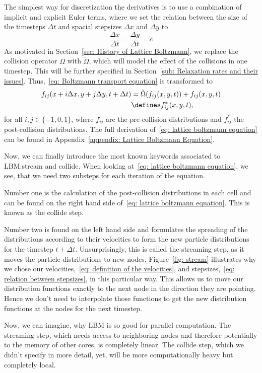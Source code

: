 The simplest way for discretization the derivatives is to use a combination of implicit and explicit Euler terms, where we set the relation between the size of the timesteps $\Delta t$ and spacial stepsizes $\Delta x$ and $\Delta y$ to
\begin{equation}
  \label{eq: relation between stepsizes}
  \frac{\Delta x} {\Delta{t}} = \frac{\Delta y} {\Delta{t}} = c
\end{equation}
As motivated in Section~\ref{sec: History of Lattice Boltzmann}, we replace the collision operator $\Omega$ with $\tilde{\Omega}$, which will model the effect of the collisions in one timestep. This will be further specified in Section~\ref{sub: Relaxation rates and their issues}.
Thus,~\eqref{eq: Boltzmann transport equation} is transformed to
\begin{equation}
  \label{eq: lattice boltzmann equation}
  \begin{aligned}
    f_{ij}(x + i \Delta x , y + j \Delta y,t + \Delta t)
    &= \tilde{\Omega}(f_{ij}(x,y,t))
    + f_{ij}(x,y,t)
    \\&
    \defines f_{ij}^*(x, y, t),
  \end{aligned}
\end{equation}
for all $i,j\in \{-1, 0, 1\}$, where $f_{ij}$ are the pre-collision distributions and $f_{ij}^*$ the post-collision distributions.
The full derivation of~\eqref{eq: lattice boltzmann equation} can be found in Appendix~\ref{appendix: Lattice Boltzmann Equation}.

Now, we can finally introduce the most known keywords associated to LBM:\@ stream and collide.
When looking at~\eqref{eq: lattice boltzmann equation}, we see, that we need two substeps for each iteration of the equation.

Number one is the calculation of the post-collision distributions in each cell and can be found on the right hand side of~\eqref{eq: lattice boltzmann equation}. This is known as the collide step.

Number two is found on the left hand side and formulates the spreading of the distributions according to their velocities to form the new particle distributions for the timestep $t+\Delta t$.
Unsurprisingly, this is called the streaming step, as it moves the particle distributions to new nodes.
Figure~\ref{fig: stream} illustrates why we chose our velocities,~\eqref{eq: definition of the velocities}, and stepsizes,~\eqref{eq: relation between stepsizes}, in this particular way.
This allows us to move our distribution functions exactly to the next node in the direction they are pointing. Hence we don't need to interpolate those functions to get the new distribution functions at the nodes for the next timestep.

Now, we can imagine, why LBM is so good for parallel computation.
The streaming step, which needs access to neighboring nodes and therefore potentially to the memory of other cores, is completely linear.
The collide step, which we didn't specify in more detail, yet, will be more computationally heavy but completely local.
